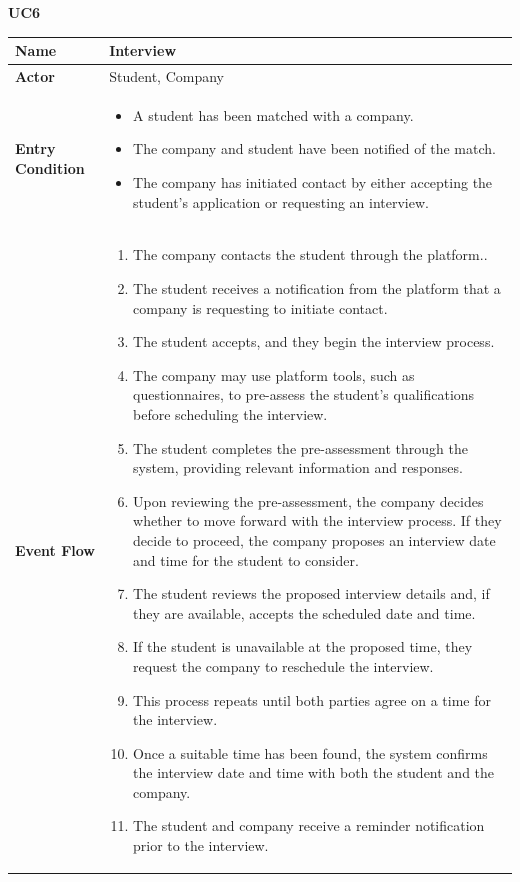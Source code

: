 \textbf{UC6}

\begin{longtable}{|p{}|p{}|}
\hline
\textbf{Name} &  Interview\\
\hline
\textbf{Actor} &  Student, Company\\
\hline
\textbf{Entry Condition} &  
\begin{itemize}
    \item A student has been matched with a company.
    \item The company and student have been notified of the match.
    \item The company has initiated contact by either accepting the student's application or requesting an interview.
\end{itemize} 
\\
\hline
\textbf{Event Flow} &  
\begin{enumerate}
    \item The company contacts the student through the platform..
    \item The student receives a notification from the platform that a company is requesting to initiate contact.
    \item The student accepts, and they begin the interview process.
    \item The company may use platform tools, such as questionnaires, to pre-assess the student's qualifications before scheduling the interview.
    \item The student completes the pre-assessment through the system, providing relevant information and responses.
    \item Upon reviewing the pre-assessment, the company decides whether to move forward with the interview process. If they decide to proceed, the company proposes an interview date and time for the student to consider.
    \item The student reviews the proposed interview details and, if they are available, accepts the scheduled date and time.
    \item If the student is unavailable at the proposed time, they request the company to reschedule the interview.
    \item This process repeats until both parties agree on a time for the interview.
    \item Once a suitable time has been found, the system confirms the interview date and time with both the student and the company.
    \item The student and company receive a reminder notification prior to the interview.

\end{enumerate}
\end{longtable}
